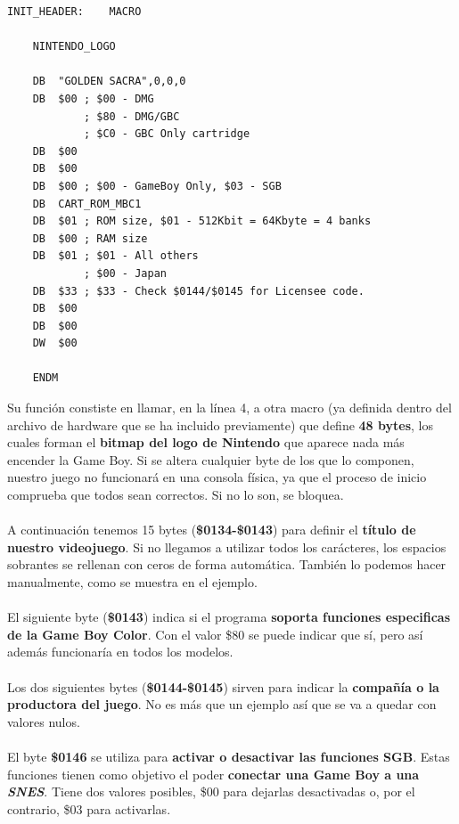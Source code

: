 \begin{lstlisting}[caption={Cabecera del cartucho}, label={code:header}]
INIT_HEADER:	MACRO

	NINTENDO_LOGO

	DB	"GOLDEN SACRA",0,0,0
	DB	$00	; $00 - DMG 
			; $80 - DMG/GBC
			; $C0 - GBC Only cartridge
	DB	$00
	DB	$00
	DB	$00	; $00 - GameBoy Only, $03 - SGB
	DB	CART_ROM_MBC1
	DB	$01	; ROM size, $01 - 512Kbit = 64Kbyte = 4 banks
	DB	$00 ; RAM size
	DB	$01	; $01 - All others
			; $00 - Japan
	DB	$33	; $33 - Check $0144/$0145 for Licensee code.
	DB	$00
	DB	$00
	DW	$00
	
	ENDM
\end{lstlisting}

Su función constiste en llamar, en la línea 4, a otra macro (ya definida dentro del archivo de hardware que se ha incluido previamente) que define \textbf{48 bytes}, los cuales forman el \textbf{bitmap del logo de Nintendo} que aparece nada más encender la Game Boy. Si se altera cualquier byte de los que lo componen, nuestro juego no funcionará en una consola física, ya que el proceso de inicio comprueba que todos sean correctos. Si no lo son, se bloquea.
\\ \\
A continuación tenemos 15 bytes (\textbf{\$0134-\$0143}) para definir el \textbf{título de nuestro videojuego}. Si no llegamos a utilizar todos los carácteres, los espacios sobrantes se rellenan con ceros de forma automática. También lo podemos hacer manualmente, como se muestra en el ejemplo.
\\ \\
El siguiente byte (\textbf{\$0143}) indica si el programa \textbf{soporta funciones especificas de la Game Boy Color}. Con el valor \$80 se puede indicar que sí, pero así además funcionaría en todos los modelos.
\\ \\
Los dos siguientes bytes (\textbf{\$0144-\$0145}) sirven para indicar la \textbf{compañía o la productora del juego}. No es más que un ejemplo así que se va a quedar con valores nulos.
\\ \\
El byte \textbf{\$0146} se utiliza para \textbf{activar o desactivar las funciones SGB}. Estas funciones tienen como objetivo el poder \textbf{conectar una Game Boy a una \textit{SNES}}. Tiene dos valores posibles, \$00 para dejarlas desactivadas o, por el contrario, \$03 para activarlas.
\\ \\

